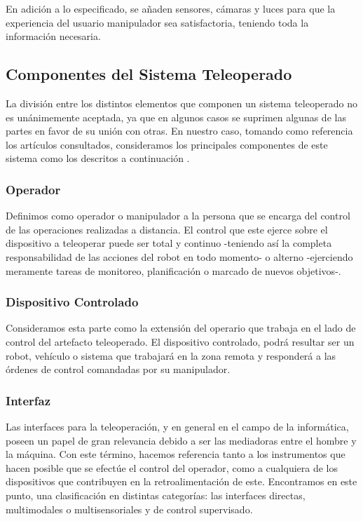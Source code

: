 En adición a lo especificado, se añaden sensores, cámaras y luces para que la experiencia del usuario manipulador sea satisfactoria, teniendo toda la información necesaria.

\subsection{Componentes del Sistema Teleoperado}

La división entre los distintos elementos que componen un sistema teleoperado no es unánimemente aceptada, ya que en algunos casos se suprimen algunas de las partes en favor de su unión con otras. En nuestro caso, tomando como referencia los artículos consultados, consideramos los principales componentes de este sistema como los descritos a continuación \cite{15}. 

\subsubsection{Operador}

Definimos como operador o manipulador a la persona que se encarga del control de las operaciones realizadas a distancia. El control que este ejerce sobre el dispositivo a teleoperar puede ser total y continuo -teniendo así la completa responsabilidad de las acciones del robot en todo momento- o alterno -ejerciendo meramente tareas de monitoreo, planificación o marcado de nuevos objetivos-.


\subsubsection{Dispositivo Controlado} 

Consideramos esta parte como la extensión del operario que trabaja en el lado de control del artefacto teleoperado. El dispositivo controlado, podrá resultar ser un robot, vehículo o sistema que trabajará en la zona remota y responderá a las órdenes de control comandadas por su manipulador.

\subsubsection{Interfaz}

Las interfaces para la teleoperación, y en general en el campo de la informática, poseen un papel de gran relevancia debido a ser las mediadoras entre el hombre y la máquina. Con este término, hacemos referencia tanto a los instrumentos que hacen posible que se efectúe el control del operador, como a cualquiera de los dispositivos que contribuyen en la retroalimentación de este. Encontramos en este punto, una clasificación en distintas categorías: las interfaces directas, multimodales o multisensoriales y de control supervisado.

